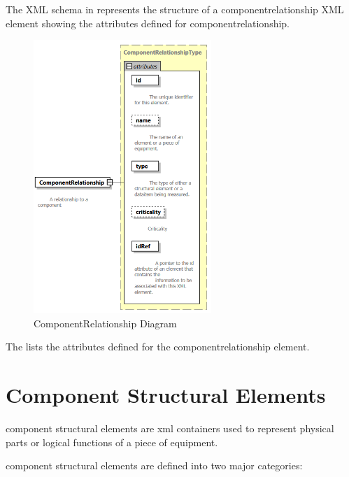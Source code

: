 The XML schema in  represents the structure of a \gls{componentrelationship} XML element showing the attributes defined for \gls{componentrelationship}.

\begin{figure}[ht]
  \centering
  \includegraphics[width=0.6\textwidth]{figures/componentrelationship-schema-diagram.png}
  \caption{ComponentRelationship Diagram}
  \label{fig:componentrelationship-diagram}
\end{figure}
\FloatBarrier

The  lists the attributes defined for the \gls{componentrelationship} element.



\section{Component Structural Elements}
\label{sec:Component Structural Elements}

\gls{component} \glspl{structural element} are \gls{xml} containers used to represent physical parts or logical functions of a piece of equipment.

\gls{component} \glspl{structural element} are defined into two major categories:

